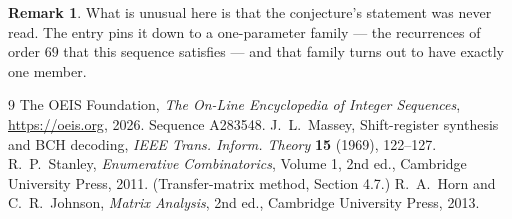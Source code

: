 \documentclass[11pt,a4paper]{article}
\theoremstyle{plain}
\theoremstyle{definition}
\newtheorem{remark}[theorem]{Remark}
\begin{document}
\begin{remark}
What is unusual here is that the conjecture's statement was never read. The entry pins it down
to a one-parameter family --- the recurrences of order $69$ that this sequence satisfies
--- and that family turns out to have exactly one member.
\end{remark}

\begin{thebibliography}{9}
 The OEIS Foundation, \emph{The On-Line Encyclopedia of Integer
Sequences}, \url{https://oeis.org}, 2026. Sequence A283548.
 J.~L.~Massey, Shift-register synthesis and BCH decoding, \emph{IEEE
Trans. Inform. Theory} \textbf{15} (1969), 122--127.
 R.~P.~Stanley, \emph{Enumerative Combinatorics}, Volume 1, 2nd ed.,
Cambridge University Press, 2011. (Transfer-matrix method, Section 4.7.)
 R.~A.~Horn and C.~R.~Johnson, \emph{Matrix Analysis}, 2nd ed., Cambridge
University Press, 2013.
\end{thebibliography}
\end{document}
